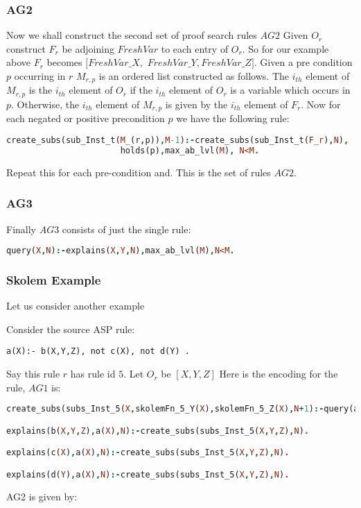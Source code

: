 \documentclass[sigconf]{acmart}
\begin{document}
\subsubsection{AG2}
Now we shall construct the second set of proof search rules $AG2$ Given $O_{r}$ construct $F_{r}$ be adjoining $FreshVar$ to each entry of $O_{r}$. So for our example above $F_{r}$ becomes $[FreshVar\_X,$ $FreshVar\_Y,FreshVar\_Z]$. Given a pre condition $p$ occurring in $r$ $M_{r,p}$ is an ordered list constructed as follows. The $i_{th}$ element of $M_{r,p}$ is the $i_{th}$ element of $O_{r}$ if the $i_{th}$ element of $O_{r}$ is a variable which occurs in $p$. Otherwise, the $i_{th}$ element of $M_{r,p}$ is given by the $i_{th}$ element of $F_{r}$. Now for each negated or positive precondition $p$ we have the following rule:
\begin{lstlisting}[language=Prolog,frame=none]
 create_subs(sub_Inst_t(M_(r,p)),M-1):-create_subs(sub_Inst_t(F_r),N),
                       holds(p),max_ab_lvl(M), N<M.   
\end{lstlisting}
Repeat this for each pre-condition and. This is the set of rules $AG2$.

\subsubsection{AG3}
Finally $AG3$ consists of just the single rule:
\begin{lstlisting}[language=Prolog,frame=none]
query(X,N):-explains(X,Y,N),max_ab_lvl(M),N<M.
\end{lstlisting}

\subsubsection{Skolem Example}
Let us consider another example

Consider the source ASP rule:
\begin{verbatim}
a(X):- b(X,Y,Z), not c(X), not d(Y) .    
\end{verbatim}
Say this rule $r$ has rule id $5$. 
Let $O_{r}$ be $[X,Y,Z]$ Here is the encoding for the rule, $AG1$ is:
\begin{lstlisting}[language=Prolog,frame=none]
create_subs(subs_Inst_5(X,skolemFn_5_Y(X),skolemFn_5_Z(X),N+1):-query(a(X),N),max_ab_lvl(M),N<M-1.

explains(b(X,Y,Z),a(X),N):-create_subs(subs_Inst_5(X,Y,Z),N).

explains(c(X),a(X),N):-create_subs(subs_Inst_5(X,Y,Z),N).

explains(d(Y),a(X),N):-create_subs(subs_Inst_5(X,Y,Z),N).
\end{lstlisting}
AG2 is given by:
\end{document}
